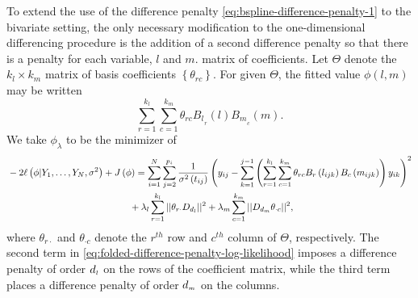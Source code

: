 To extend the use of the difference penalty \eqref{eq:bspline-difference-penalty-1} to the bivariate setting, the only necessary modification to the one-dimensional differencing procedure is the addition of a second difference penalty so that there is a penalty for each variable, $l$ and $m$. matrix of coefficients. Let $\Theta$ denote the $k_l \times k_m$ matrix of basis coefficients $\left\{\theta_{rc}\right\}$. For given $\Theta$, the fitted value $\phi\left(l,m\right)$ may be written 
\[
\sum_{r=1}^{k_l} \sum_{c=1}^{k_m} \theta_{rc} {B_l}_{_{r}}\left(l\right){B_m}_{_{c}}\left(m\right).
\]
\noindent
We take $\phi_\lambda$ to be the minimizer of 
\begin{align} 
\begin{split}\label{eq:folded-difference-penalty-log-likelihood}
&-2\ell\left(\phi \vert Y_1,\dots, Y_N, \sigma^2\right) + J\left(\phi\right) = \sum_{i=1}^N \sum_{j=2}^{p_i} \frac{1}{\sigma^{2}\left({t_{ij}}\right)} \left(y_{ij} - \sum_{k=1}^{j-1} \left( \sum_{r=1}^{k_l} \sum_{c=1}^{k_m} \theta_{rc} B_r\left(l_{ijk}\right)B_c\left(m_{ijk}\right)\right)y_{ik} \right)^2 \\ 
&\phantom{{} - 2\ell\left(\phi \vert Y_1,\dots, Y_N\right) + J\left(\phi\right) =  } + \lambda_l \sum_{r=1}^{k_l} \vert\vert \theta_{r \cdot}  D_{d_{\ms l}} \vert\vert^2 + \lambda_m \sum_{c=1}^{k_m}\vert \vert  D_{d_{\ms m}} \theta_{\cdot c} \vert\vert^2,
\end{split}
\end{align}
\noindent
where $\theta_{r \cdot}$ and $\theta_{\cdot c}$ denote the $r^{th}$ row and $c^{th}$ column of $\Theta$, respectively. The second term in \eqref{eq:folded-difference-penalty-log-likelihood} imposes a difference penalty of order $d_{\scriptscriptstyle l}$ on the rows of the coefficient matrix, while the third term places a difference penalty of order $d_{\scriptscriptstyle m}$ on the columns. 

\bigskip

